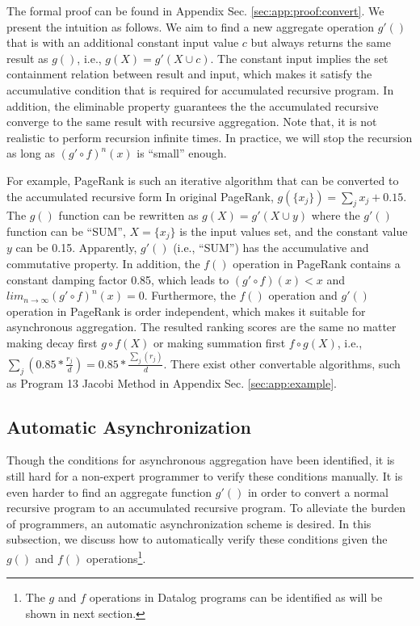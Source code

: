 The formal proof can be found in Appendix Sec. \ref{sec:app:proof:convert}. We present the intuition as follows. We aim to find a new aggregate operation $g'()$ that is with an additional constant input value $c$ but always returns the same result as $g()$, i.e., $g(X)=g'(X\cup c)$. The constant input implies the set containment relation between result and input, which makes it satisfy the %
accumulative condition that is required for accumulated recursive program. In addition, the eliminable property guarantees the %
the accumulated recursive converge to the same result with recursive aggregation.%
Note that, it is not realistic to perform recursion infinite times. In practice, we will stop the recursion as long as $(g'\circ f)^n(x)$ is ``small'' enough.

For example, PageRank is such an iterative algorithm that can be converted to the accumulated recursive form %
In original PageRank, $g(\{x_j\})=\sum_j{x_j}+0.15$. The $g()$ function can be rewritten as $g(X)=g'(X\cup y)$ where the $g'()$ function can be ``SUM'', $X=\{x_j\}$ is the input values set, and the constant value $y$ can be 0.15. Apparently, $g'()$ (i.e., ``SUM'') has the accumulative and commutative property. In addition, the $f()$ operation in PageRank contains a constant damping factor 0.85, which leads to $(g'\circ f)(x)<x$ and $lim_{n\rightarrow\infty}(g'\circ f)^n(x)=0$. Furthermore, the $f()$ operation and $g'()$ operation in PageRank is order independent, which makes it suitable for asynchronous aggregation. The resulted ranking scores are the same no matter making decay first $g\circ f(X)$ or making summation first $f\circ g(X)$, i.e., $\sum_j(0.85*\frac{r_j}{d})=0.85*\frac{\sum_j(r_j)}{d}$. There exist other convertable algorithms, such as Program 13 Jacobi Method in Appendix Sec. \ref{sec:app:example}.


\subsection{Automatic Asynchronization}
\label{sec:async:autoasync}

Though the conditions for asynchronous aggregation have been identified, it is still hard for a non-expert programmer to verify these conditions manually. It is even harder to find an aggregate function $g'()$ in order to convert a normal recursive program to an accumulated recursive program.
 To alleviate the burden of programmers, an automatic asynchronization scheme is desired. In this subsection, we discuss how to automatically verify these conditions given the $g()$ and $f()$ operations\footnote{The $g$ and $f$ operations in Datalog programs can be identified as will be shown in next section.}.

